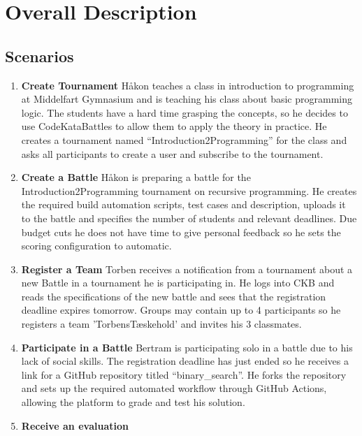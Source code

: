\clearpage
\newpage
\section{Overall Description}
\label{sec:general_disc}

\subsection{Scenarios}
\begin{enumerate}
    \item {\textbf{Create Tournament}}\newline
    Håkon teaches a class in introduction to programming at Middelfart Gymnasium and is teaching his class about basic programming logic.
    The students have a hard time grasping the concepts, so he decides to use CodeKataBattles to allow them to apply the theory in practice.
    He creates a tournament named “Introduction2Programming” for the class and asks all participants to create a user and subscribe to the tournament. 
    \item {\textbf{Create a Battle}}\newline
    Håkon is preparing a battle for the Introduction2Programming tournament on recursive programming. 
    He creates the required build automation scripts, test cases and description, uploads it to the battle and specifies the number of students and relevant deadlines. 
    Due budget cuts he does not have time to give personal feedback so he sets the scoring configuration to automatic. 
    \item {\textbf{Register a Team}}\newline
    Torben receives a notification from a tournament about a new Battle in a tournament he is participating in. 
He logs into CKB and reads the specifications of the new battle and sees that the registration deadline expires tomorrow. 
Groups may contain up to 4 participants so he registers a team 'TorbensTæskehold' and invites his 3 classmates.
    \item {\textbf{Participate in a Battle}}\newline
    Bertram is participating solo in a battle due to his lack of social skills. 
    The registration deadline has just ended so he receives a link for a GitHub repository titled “binary\_search”. He forks the repository and sets up the required automated workflow through GitHub Actions, allowing the platform to grade and test his solution. 
    \item {\textbf{Receive an evaluation}}\newline

\end{enumerate}
